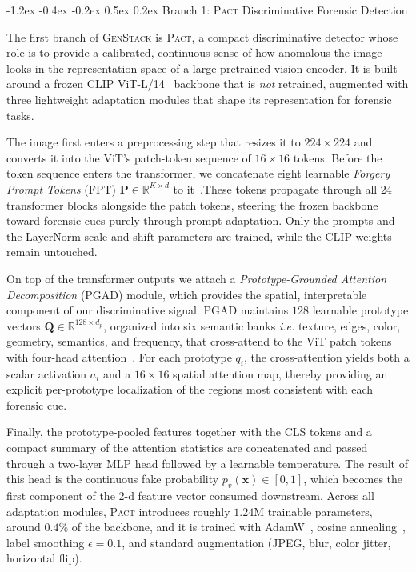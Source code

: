 \documentclass[10pt,twocolumn,letterpaper]{article}
\makeatletter
\renewcommand\subsection{\@startsection{subsection}{2}{\z@}%
  {-1.2ex \@plus -0.4ex \@minus -0.2ex}%
  {0.5ex \@plus 0.2ex}%
  {\normalfont\normalsize\bfseries}}
\newcommand{\vfive}{\textsc{Pact}}
\makeatother
\begin{document}
\subsection{Branch 1: \vfive{}  Discriminative Forensic Detection}
\label{sec:pact}

The first branch of \textsc{GenStack} is \vfive, a compact discriminative detector whose role is to provide a calibrated, continuous sense of how anomalous the image looks in the representation space of a large pretrained vision encoder. It is built around a frozen CLIP ViT-L/14~\cite{clip} backbone that is \emph{not} retrained, augmented with three lightweight adaptation modules that shape its representation for forensic tasks.

The image first enters a preprocessing step that resizes it to $224{\times}224$ and converts it into the ViT's patch-token sequence of $16{\times}16$ tokens. Before the token sequence enters the transformer, we concatenate eight learnable \emph{Forgery Prompt Tokens} (FPT) $\mathbf{P}\!\in\!\mathbb{R}^{K\times d}$ to it~\cite{vpt}.{These tokens propagate through all $24$ transformer blocks alongside the patch tokens, steering the frozen backbone toward forensic cues purely through prompt adaptation. Only the prompts and the LayerNorm scale and shift parameters are trained, while the CLIP weights remain untouched.}

On top of the transformer outputs we attach a \emph{Prototype-Grounded Attention Decomposition} (PGAD) module, which provides the spatial, interpretable component of our discriminative signal. PGAD maintains $128$ learnable prototype vectors $\mathbf{Q}\!\in\!\mathbb{R}^{128\times d_p}$, organized into six semantic banks \textit{i.e.} texture, edges, color, geometry, semantics, and frequency, that cross-attend to the ViT patch tokens with four-head attention~\cite{protopnet,tesnet}. For each prototype $q_i$, the cross-attention yields both a scalar activation $a_i$ and a $16{\times}16$ spatial attention map, thereby providing an explicit per-prototype localization of the regions most consistent with each forensic cue.

Finally, the prototype-pooled features together with the CLS tokens and a compact summary of the attention statistics are concatenated and passed through a two-layer MLP head followed by a learnable temperature. The result of this head is the continuous fake probability $p_v(\mathbf{x})\!\in\![0,1]$, which becomes the first component of the 2-d feature vector consumed downstream. Across all adaptation modules, \vfive{} introduces roughly $1.24$M trainable parameters, around $0.4\%$ of the backbone, and it is trained with AdamW~\cite{adamw}, cosine annealing~\cite{cosine_annealing}, label smoothing $\epsilon{=}0.1$, and standard augmentation (JPEG, blur, color jitter, horizontal flip).
\end{document}
